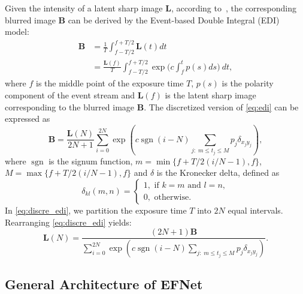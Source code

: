 \documentclass[runningheads]{llncs}
\newcommand{\vB}{\mathbf{B}}
\newcommand{\vL}{\mathbf{L}}
\DeclareMathOperator*{\signum}{sgn}
\newlength \g
\begin{document}
Given the intensity of a latent sharp image $\vL$, according to~\cite{pan2019bringing_high_framerate}, the corresponding blurred image $\vB$ can be derived by the Event-based Double Integral (EDI) model:
{\small
\begin{equation} \label{eq:edi}
\begin{split}
\vB &=  \frac{1}{T} \int_{f-T/2}^{f+T/2} \vL(t) dt\\
& = \frac{\vL(f)}{T}\int_{f-T/2}^{f+T/2}  \exp \Big (c \int_{f}^{t} p(s) ds\Big)\ dt,
\end{split}
\end{equation}
}where $f$ is the middle point of the exposure time $T$, $p(s)$ is the polarity component of the event stream and $\vL(f)$ is the latent sharp image corresponding to the blurred image $\vB$. The discretized version of \eqref{eq:edi} can be expressed as
{\small
\begin{equation} \label{eq:discre_edi}
\vB = \frac{\vL(N)}{2N+1} \sum_{i=0}^{2N} \exp\left(c \signum(i-N) \sum_{j:\;m \leq t_j \leq M} p_j\delta_{x_j y_j}\right),
\end{equation}
}where $\signum$ is the signum function, $m = \min\{f+T/2(i/N-1),f\}$, $M = \max\{f+T/2(i/N-1),f\}$ and $\delta$ is the Kronecker delta, defined as
\begin{equation} \label{eq:kronecker:delta}
    \delta_{kl}(m,n) = 
    \begin{cases}
    1, \text{ if } k=m \text{ and } l=n,\\
    0, \text{ otherwise.}
    \end{cases}
\end{equation}
In \eqref{eq:discre_edi}, we partition the exposure time $T$ into $2N$ equal intervals. Rearranging \eqref{eq:discre_edi} yields:
{\small
\begin{equation}\label{eq:discre_ln}
\vL(N) = \frac{(2N+1)\vB}{\sum_{i=0}^{2N} \exp\left(c \signum(i-N) \sum_{j:\;m \leq t_j \leq M} p_j\delta_{x_j y_j}\right)}.
\end{equation}
}

\subsection{General Architecture of EFNet}
\label{sec:method:general}
\end{document}
